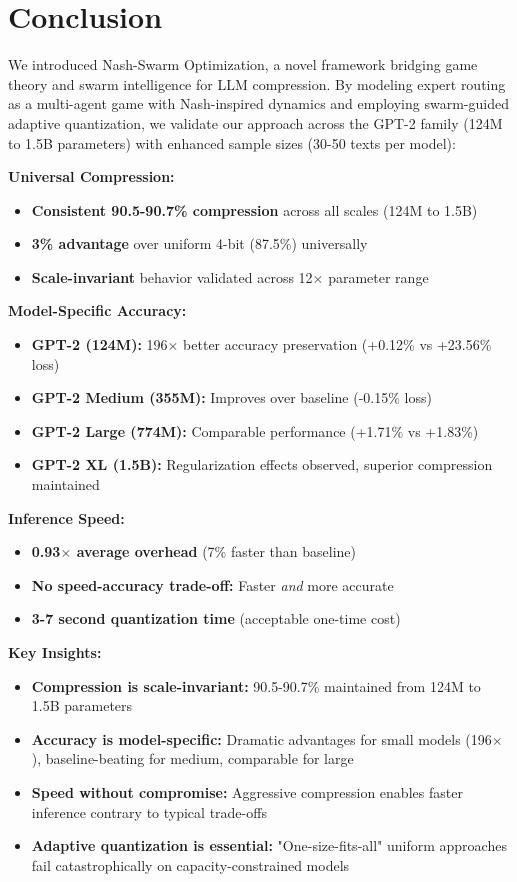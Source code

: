 \documentclass[11pt]{article}
\begin{document}
\section{Conclusion}
\label{sec:conclusion}

We introduced Nash-Swarm Optimization, a novel framework bridging game theory and swarm intelligence for LLM compression. By modeling expert routing as a multi-agent game with Nash-inspired dynamics and employing swarm-guided adaptive quantization, we validate our approach across the GPT-2 family (124M to 1.5B parameters) with enhanced sample sizes (30-50 texts per model):

\textbf{Universal Compression:}
\begin{itemize}
    \item \textbf{Consistent 90.5-90.7\% compression} across all scales (124M to 1.5B)
    \item \textbf{3\% advantage} over uniform 4-bit (87.5\%) universally
    \item \textbf{Scale-invariant} behavior validated across 12$\times$ parameter range
\end{itemize}

\textbf{Model-Specific Accuracy:}
\begin{itemize}
    \item \textbf{GPT-2 (124M):} 196$\times$ better accuracy preservation (+0.12\% vs +23.56\% loss)
    \item \textbf{GPT-2 Medium (355M):} Improves over baseline (-0.15\% loss)
    \item \textbf{GPT-2 Large (774M):} Comparable performance (+1.71\% vs +1.83\%)
    \item \textbf{GPT-2 XL (1.5B):} Regularization effects observed, superior compression maintained
\end{itemize}

\textbf{Inference Speed:}
\begin{itemize}
    \item \textbf{0.93$\times$ average overhead} (7\% faster than baseline)
    \item \textbf{No speed-accuracy trade-off:} Faster \textit{and} more accurate
    \item \textbf{3-7 second quantization time} (acceptable one-time cost)
\end{itemize}

\textbf{Key Insights:}
\begin{itemize}
    \item \textbf{Compression is scale-invariant:} 90.5-90.7\% maintained from 124M to 1.5B parameters
    \item \textbf{Accuracy is model-specific:} Dramatic advantages for small models (196$\times$), baseline-beating for medium, comparable for large
    \item \textbf{Speed without compromise:} Aggressive compression enables faster inference contrary to typical trade-offs
    \item \textbf{Adaptive quantization is essential:} "One-size-fits-all" uniform approaches fail catastrophically on capacity-constrained models
\end{itemize}
\end{document}
